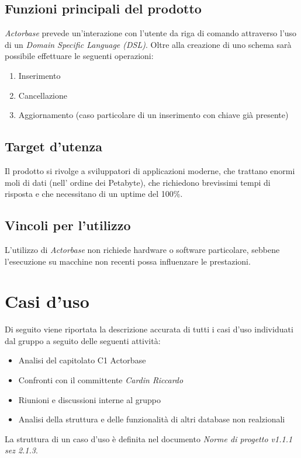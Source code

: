 \documentclass[a4paper]{report}
\newcommand{\mychapter}[2]{
	\setcounter{chapter}{#1}
	\setcounter{section}{0}
	\setcounter{subsection}{1}
	\chapter*{#2}
	\addcontentsline{toc}{chapter}{#2}
}
\begin{document}
	\section{Funzioni principali del prodotto}
		\emph{Actorbase} prevede un'interazione con l'utente da riga di comando attraverso l'uso di un 
		\emph{Domain Specific Language (DSL)}. 
		Oltre alla creazione di uno schema sarà possibile effettuare le seguenti operazioni:
		\begin{enumerate}
			\item Inserimento
			\item Cancellazione 
			\item Aggiornamento (caso particolare di un inserimento con chiave già presente)
		\end{enumerate}
	\section{Target d'utenza}
		Il prodotto si rivolge a sviluppatori di applicazioni moderne, che trattano enormi moli di dati (nell'
		ordine dei Petabyte), che richiedono brevissimi tempi di risposta e che necessitano di un uptime 
		del 100\%.
	\section{Vincoli per l'utilizzo}
		L'utilizzo di \emph{Actorbase} non richiede hardware o software particolare, sebbene l'esecuzione 
		su macchine non recenti possa influenzare le prestazioni.	
	
	\mychapter{3}{Casi d'uso}
		Di seguito viene riportata la descrizione accurata di tutti i casi d'uso individuati dal gruppo a seguito
		delle seguenti attività:
		\begin{itemize}
			\item Analisi del capitolato C1 Actorbase
			\item Confronti con il committente \emph{Cardin Riccardo}
			\item Riunioni e discussioni interne al gruppo
			\item Analisi della struttura e delle funzionalità di altri database non realzionali
		\end{itemize}
		La struttura di un caso d'uso è definita nel documento \emph{Norme di progetto v1.1.1 sez 2.1.3}.
		\newpage
\end{document}
